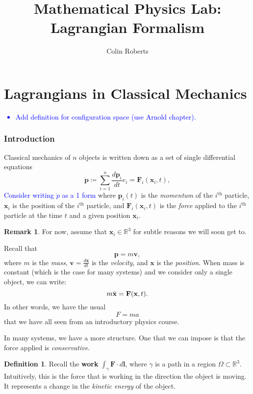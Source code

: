 \documentclass[12pt]{article}
\title{Mathematical Physics Lab: Lagrangian Formalism}
\author{Colin Roberts}
\newcommand{\R}{\mathbb{R}}
\theoremstyle{definition}
\newtheorem{definition}{Definition}[part]
\newtheorem{remark}{Remark}[part]
\begin{document}
\maketitle

\part{Lagrangians in Classical Mechanics}

\textcolor{blue}{
\begin{itemize}
    \item Add definition for configuration space (use Arnold chapter).
    
\end{itemize}

}

\section*{Introduction}
Classical mechanics of $n$ objects is written down as a set of single differential equations
\[
\Dot{\mathbf{p}}\coloneqq \sum_{i=1}^n \frac{d\mathbf{p}_i}{dt}e_i=\mathbf{F}_i(\mathbf{x}_i,t),
\]
\textcolor{blue}{Consider writing $\dot{p}$ as a 1 form}
where $\mathbf{p}_i(t)$ is the \emph{momentum} of the $i^\textrm{th}$ particle, $\mathbf{x}_i$ is the position of the $i^\textrm{th}$ particle, and $\mathbf{F}_i(\mathbf{x}_i,t)$ is the \emph{force} applied to the $i^\textrm{th}$ particle at the time $t$ and a given position $\mathbf{x}_i$.  

\begin{remark}
For now, assume that $\mathbf{x}_i \in \R^3$ for subtle reasons we will soon get to. 
\end{remark}

Recall that 
\[
\mathbf{p}=m\mathbf{v},
\]
where $m$ is the \emph{mass}, $\mathbf{v}=\frac{d\mathbf{x}}{dt}$ is the \emph{velocity}, and $\mathbf{x}$ is the \emph{position}. When mass is constant (which is the case for many systems) and we consider only a single object, we can write:
\[
m\Ddot{\mathbf{x}}=\mathbf{F}(\mathbf{x},t).
\]
In other words, we have the usual
\[
F=ma
\]
that we have all seen from an introductory physics course.

In many systems, we have a more structure.  One that we can impose is that the force applied is \emph{conservative}.  

\begin{definition}
Recall the \textbf{work} $\int_\gamma \mathbf{F}\cdot d\mathbf{l}$, where $\gamma$ is a path in a region $\Omega \subset \R^3$. Intuitively, this is the force that is working in the direction the object is moving.  It represents a change in the \emph{kinetic energy} of the object.
\end{definition}
\end{document}
